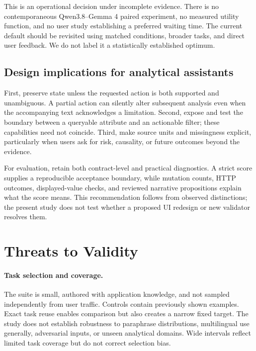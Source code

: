 \documentclass[10pt,twocolumn,letterpaper]{article}
\begin{document}
This is an operational decision under incomplete evidence. There is no contemporaneous Qwen3.8--Gemma 4 paired experiment, no measured utility function, and no user study establishing a preferred waiting time. The current default should be revisited using matched conditions, broader tasks, and direct user feedback. We do not label it a statistically established optimum.

\subsection{Design implications for analytical assistants}
First, preserve state unless the requested action is both supported and unambiguous. A partial action can silently alter subsequent analysis even when the accompanying text acknowledges a limitation. Second, expose and test the boundary between a queryable attribute and an actionable filter; these capabilities need not coincide. Third, make source units and missingness explicit, particularly when users ask for risk, causality, or future outcomes beyond the evidence.

For evaluation, retain both contract-level and practical diagnostics. A strict score supplies a reproducible acceptance boundary, while mutation counts, HTTP outcomes, displayed-value checks, and reviewed narrative propositions explain what the score means. This recommendation follows from observed distinctions; the present study does not test whether a proposed UI redesign or new validator resolves them.

\section{Threats to Validity}
\paragraph{Task selection and coverage.}
The suite is small, authored with application knowledge, and not sampled independently from user traffic. Controls contain previously shown examples. Exact task reuse enables comparison but also creates a narrow fixed target. The study does not establish robustness to paraphrase distributions, multilingual use generally, adversarial inputs, or unseen analytical domains. Wide intervals reflect limited task coverage but do not correct selection bias.
\end{document}
